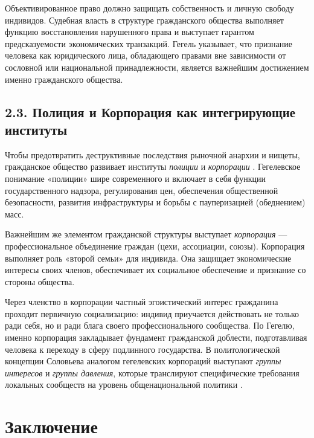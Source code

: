\documentclass[a4paper, 14pt]{extarticle}
\begin{document}
Объективированное право должно защищать собственность и личную свободу индивидов. Судебная власть в структуре гражданского общества выполняет функцию восстановления нарушенного права и выступает гарантом предсказуемости экономических транзакций. Гегель указывает, что признание человека как юридического лица, обладающего правами вне зависимости от сословной или национальной принадлежности, является важнейшим достижением именно гражданского общества.

\subsection{2.3. Полиция и Корпорация как интегрирующие институты}
Чтобы предотвратить деструктивные последствия рыночной анархии и нищеты, гражданское общество развивает институты \textit{полиции} и \textit{корпорации} \cite{Hegel}. Гегелевское понимание «полиции» шире современного и включает в себя функции государственного надзора, регулирования цен, обеспечения общественной безопасности, развития инфраструктуры и борьбы с пауперизацией (обеднением) масс.

Важнейшим же элементом гражданской структуры выступает \textit{корпорация} --- профессиональное объединение граждан (цехи, ассоциации, союзы). Корпорация выполняет роль «второй семьи» для индивида. Она защищает экономические интересы своих членов, обеспечивает их социальное обеспечение и признание со стороны общества. 

Через членство в корпорации частный эгоистический интерес гражданина проходит первичную социализацию: индивид приучается действовать не только ради себя, но и ради блага своего профессионального сообщества. По Гегелю, именно корпорация закладывает фундамент гражданской доблести, подготавливая человека к переходу в сферу подлинного государства. В политологической концепции Соловьева аналогом гегелевских корпораций выступают \textit{группы интересов} и \textit{группы давления}, которые транслируют специфические требования локальных сообществ на уровень общенациональной политики \cite{Solovyev}.

\newpage

\section*{Заключение}
\end{document}
